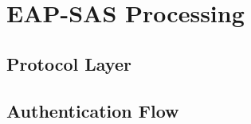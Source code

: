 \section{EAP-SAS Processing}
\toc
\subsection{Protocol Layer}
\begin{frame}{\ft}
    
\end{frame}
\subsection{Authentication Flow}
\begin{frame}{\ft}
    
\end{frame}
\begin{frame}{\ft}
    
\end{frame}